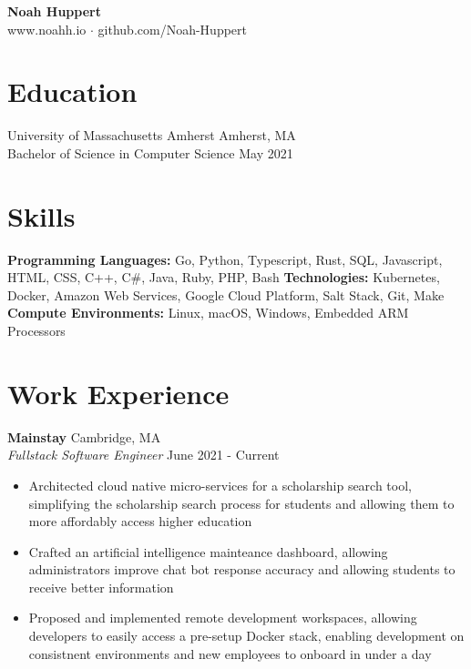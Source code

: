 \documentclass[10pt]{article}
\begin{document}

\centering
	\textbf{Noah Huppert} \\
	
	www.noahh.io $\cdot$ github.com/Noah-Huppert


\begin{flushleft}

\section{Education}
	University of Massachusetts Amherst \hfill Amherst, MA \\
	Bachelor of Science in Computer Science \hfill May 2021 \\

\section{Skills}
    \textbf{Programming Languages:} Go, Python, Typescript, Rust, SQL, Javascript, HTML, CSS, C++, C\#, Java, Ruby, PHP, Bash
	\textbf{Technologies:} Kubernetes, Docker, Amazon Web Services, Google Cloud Platform, Salt Stack, Git, Make \\
	\textbf{Compute Environments:} Linux, macOS, Windows, Embedded ARM Processors

    \section{Work Experience}
	\textbf{Mainstay} \hfill Cambridge, MA \\
	\textit{Fullstack Software Engineer} \hfill June 2021 - Current \\
    \begin{itemize}
        \item Architected cloud native micro-services for a scholarship search tool, simplifying the scholarship search process for students and allowing them to more affordably access higher education

		\item Crafted an artificial intelligence mainteance dashboard, allowing administrators improve chat bot response accuracy and allowing students to receive better information

        \item Proposed and implemented remote development workspaces, allowing developers to easily access a pre-setup Docker stack, enabling development on consistnent environments and new employees to onboard in under a day 
	\end{itemize}


\end{flushleft}
\end{document}
